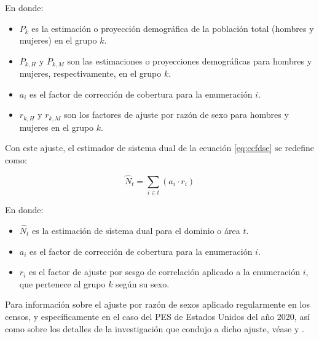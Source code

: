 \documentclass[
  12pt,
]{book}
\providecommand{\tightlist}{%
  \setlength{\itemsep}{0pt}\setlength{\parskip}{0pt}}
\begin{document}
En donde:

\begin{itemize}
\tightlist
\item
  \(P_k\) es la estimación o proyección demográfica de la población total (hombres y mujeres) en el grupo \(k\).
\item
  \(P_{k,H}\) y \(P_{k,M}\) son las estimaciones o proyecciones demográficas para hombres y mujeres, respectivamente, en el grupo \(k\).
\item
  \(a_i\) es el factor de corrección de cobertura para la enumeración \(i\).
\item
  \(r_{k,H}\) y \(r_{k,M}\) son los factores de ajuste por razón de sexo para hombres y mujeres en el grupo \(k\).
\end{itemize}

Con este ajuste, el estimador de sistema dual de la ecuación \eqref{eq:ccfdse} se redefine como:

\begin{equation}
\hat{N}_t = \sum_{i \in t} (a_i \cdot r_i)
\label{eq:dseadj}
\end{equation}

En donde:

\begin{itemize}
\tightlist
\item
  \(\hat{N}_t\) es la estimación de sistema dual para el dominio o área \(t\).
\item
  \(a_i\) es el factor de corrección de cobertura para la enumeración \(i\).
\item
  \(r_i\) es el factor de ajuste por sesgo de correlación aplicado a la enumeración \(i\), que pertenece al grupo \(k\) según su sexo.
\end{itemize}

Para información sobre el ajuste por razón de sexos aplicado regularmente en los censos, y específicamente en el caso del PES de Estados Unidos del año 2020, así como sobre los detalles de la investigación que condujo a dicho ajuste, véase \citet{Heim2022} y \citet{HeimHill2022}.


\end{document}
